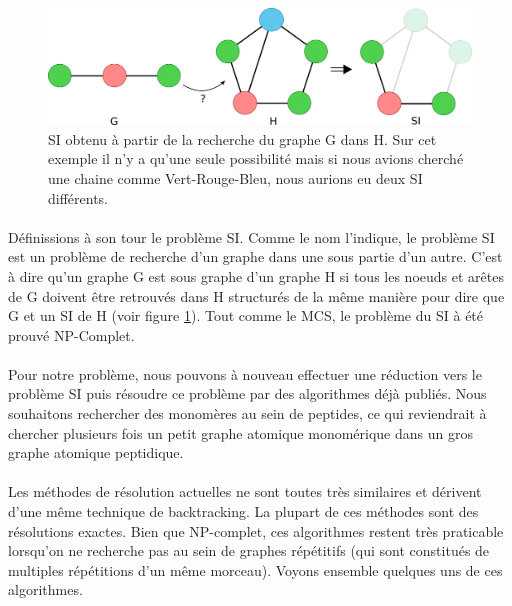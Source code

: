 \documentclass[12pt,french,twoside]{report}
\begin{document}
\begin{figure}[!h]
  \begin{center}
    \includegraphics[width=450px]{Figures/s2m/MCS-SI/si.png}
    \caption{\label{SI_fig}SI obtenu à partir de la recherche du graphe G dans H.
    Sur cet exemple il n'y a qu'une seule possibilité mais si nous avions cherché une chaine comme Vert-Rouge-Bleu, nous aurions eu deux SI différents.}
  \end{center}
\end{figure}

\paragraph{}Définissions à son tour le problème SI.
Comme le nom l'indique, le problème SI est un problème de recherche d'un graphe dans une sous partie d'un autre.
C'est à dire qu'un graphe G est sous graphe d'un graphe H si tous les noeuds et arêtes de G doivent être retrouvés dans H structurés de la même manière pour dire que G et un SI de H (voir figure \ref{SI_fig}).
Tout comme le MCS, le problème du SI à été prouvé NP-Complet\cite{garey_computers_1979}.

\paragraph{}Pour notre problème, nous pouvons à nouveau effectuer une réduction vers le problème SI puis résoudre ce problème par des algorithmes déjà publiés.
Nous souhaitons rechercher des monomères au sein de peptides, ce qui reviendrait à chercher plusieurs fois un petit graphe atomique monomérique dans un gros graphe atomique peptidique.

\paragraph{}Les méthodes de résolution actuelles ne sont toutes très similaires et dérivent d'une même technique de backtracking.
La plupart de ces méthodes sont des résolutions exactes.
Bien que NP-complet, ces algorithmes restent très praticable lorsqu'on ne recherche pas au sein de graphes répétitifs (qui sont constitués de multiples répétitions d'un même morceau).
Voyons ensemble quelques uns de ces algorithmes.
\end{document}
